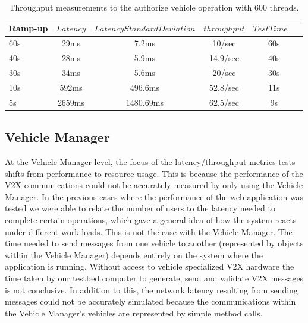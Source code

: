 	\begin{table}
		\renewcommand{\arraystretch}{1.2} %
		\centering
		\begin{tabular}{lccccc}
			\toprule
			Ramp-up           & $Latency$& $Latency Standard Deviation$ & $throughput$& $TestTime$ $$\\
			\midrule
			60s          & 29ms & 7.2ms & 10/sec & ~60s  \\
			40s          & 28ms & 5.9ms & 14.9/sec & ~40s  \\
			30s          & 34ms & 5.6ms & 20/sec & ~30s \\
			10s          & 592ms & 496.6ms & 52.8/sec & ~11s \\
			5s           & 2659ms & 1480.69ms & 62.5/sec & ~9s \\
			\bottomrule
			\end{tabular}
			
			\caption{Throughput measurements to the authorize vehicle operation with 600 threads.}
			\label{tab:table2}
		\end{table}
		
		
		
		\subsection{Vehicle Manager}
		\label{section:memory}
		At the Vehicle Manager level, the focus of the latency/throughput metrics tests shifts from performance to resource usage. This is because the performance of the V2X communications could not be accurately measured by only using the Vehicle Manager. In the previous cases where the performance of the web application was tested we were able to relate the number of users to the latency needed to complete certain operations, which gave a general idea of how the system reacts under different work loads. This is not the case with the Vehicle Manager. The time needed to send messages from one vehicle to another (represented by objects within the Vehicle Manager) depends entirely on the system where the application is running. Without access to vehicle specialized V2X hardware the time taken by our testbed computer to generate, send and validate V2X messages is not conclusive. In addition to this, the network latency resulting from sending messages could not be accurately simulated because the communications within the Vehicle Manager's vehicles are represented by simple method calls. 
		
